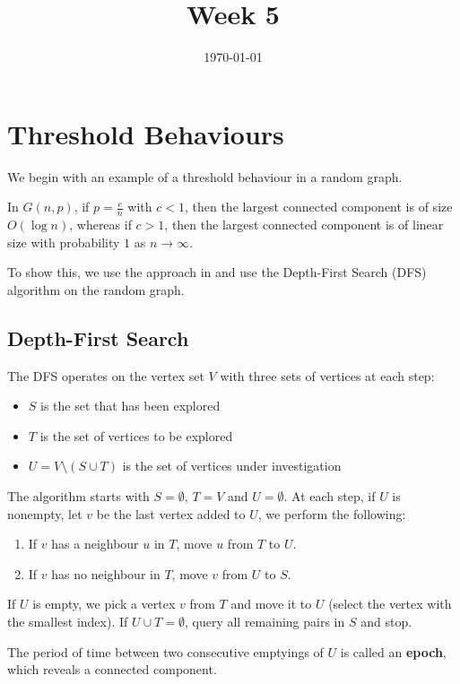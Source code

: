 \documentclass{article}
\title{Week 5}
\date{\today}
\begin{document}
\maketitle

\section{Threshold Behaviours} 

We begin with an example of a threshold behaviour in a random graph.  

\begin{example}
    In $G(n,p)$, if $p=\frac{c}{n}$ with $c<1$, then the largest connected component is of size $O(\log n)$, whereas if $c>1$, then the largest connected component is of linear size with probability $1$ as $n\to \infty$.      
\end{example}

To show this, we use the approach in \citep{krivelevich2012phase} and use the Depth-First Search (DFS) algorithm on the random graph. 

\subsection{Depth-First Search}
The DFS operates on the vertex set $V$ with three sets of vertices at each step:
\begin{itemize}
    \item $S$ is the set that has been explored
    \item $T$ is the set of vertices to be explored
    \item $U = V\setminus (S\cup T)$ is the set of vertices under investigation
\end{itemize}

The algorithm starts with $S=\emptyset$, $T=V$ and $U=\emptyset$. At each step, if $U$ is nonempty, let $v$ be the last vertex added to $U$, we perform the following:
\begin{enumerate}
    \item If $v$ has a neighbour $u$ in $T$, move $u$ from $T$ to $U$.
    \item If $v$ has no neighbour in $T$, move $v$ from $U$ to $S$.
\end{enumerate}

If $U$ is empty, we pick a vertex $v$ from $T$ and move it to $U$ (select the vertex with the smallest index). If $U\cup T=\emptyset$, query all remaining pairs in $S$ and stop.  

The period of time between two consecutive emptyings of $U$ is called an \textbf{epoch}, which reveals a connected component.  
\end{document}
